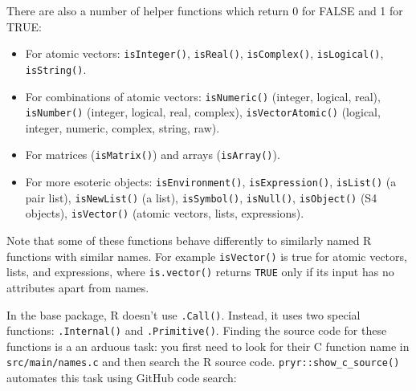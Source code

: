 \begin{Shaded}
\begin{Highlighting}[]
\StringTok{ }\NormalTok{(}\NormalTok{(} \NormalTok{=}\NormalTok{), }
\NormalTok{)}
\NormalTok{(}\NormalTok{)}
\NormalTok{(}\NormalTok{)}
\end{Highlighting}
\end{Shaded}

There are also a number of helper functions which return 0 for FALSE and
1 for TRUE:

\begin{itemize}
\item
  For atomic vectors: \texttt{isInteger()}, \texttt{isReal()},
  \texttt{isComplex()}, \texttt{isLogical()}, \texttt{isString()}.
\item
  For combinations of atomic vectors: \texttt{isNumeric()} (integer,
  logical, real), \texttt{isNumber()} (integer, logical, real, complex),
  \texttt{isVectorAtomic()} (logical, integer, numeric, complex, string,
  raw).
\item
  For matrices (\texttt{isMatrix()}) and arrays (\texttt{isArray()}).
\item
  For more esoteric objects: \texttt{isEnvironment()},
  \texttt{isExpression()}, \texttt{isList()} (a pair list),
  \texttt{isNewList()} (a list), \texttt{isSymbol()}, \texttt{isNull()},
  \texttt{isObject()} (S4 objects), \texttt{isVector()} (atomic vectors,
  lists, expressions).
\end{itemize}

Note that some of these functions behave differently to similarly named
R functions with similar names. For example \texttt{isVector()} is true
for atomic vectors, lists, and expressions, where \texttt{is.vector()}
returns \texttt{TRUE} only if its input has no attributes apart from
names.


In the base package, R doesn't use \texttt{.Call()}. Instead, it uses
two special functions: \texttt{.Internal()} and \texttt{.Primitive()}.
Finding the source code for these functions is a an arduous task: you
first need to look for their C function name in
\texttt{src/main/names.c} and then search the R source code.
\texttt{pryr::show\_c\_source()} automates this task using GitHub code
search:  

